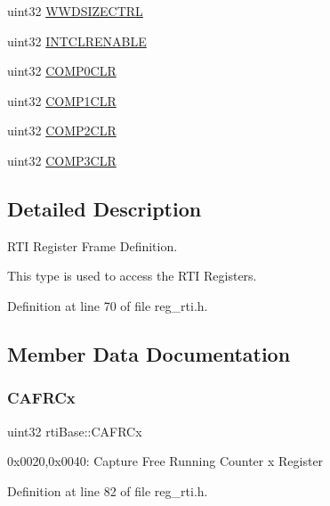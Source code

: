 \begin{DoxyCompactItemize}
uint32 \mbox{\hyperlink{structrtiBase_ad45c33765bd1083ac61de10dfe0add55}{W\+W\+D\+S\+I\+Z\+E\+C\+T\+RL}}
\item 
uint32 \mbox{\hyperlink{structrtiBase_aca543b9158f886a6d2412679cdde56c0}{I\+N\+T\+C\+L\+R\+E\+N\+A\+B\+LE}}
\item 
uint32 \mbox{\hyperlink{structrtiBase_ad86d822d66b1288e26d6fc8449d144b6}{C\+O\+M\+P0\+C\+LR}}
\item 
uint32 \mbox{\hyperlink{structrtiBase_ae40f420750f1f43dd72b7e1619d5269e}{C\+O\+M\+P1\+C\+LR}}
\item 
uint32 \mbox{\hyperlink{structrtiBase_a35ca0260e91f7626d68cf8d5ec8414c2}{C\+O\+M\+P2\+C\+LR}}
\item 
uint32 \mbox{\hyperlink{structrtiBase_acd6654f6188cb394c333a0e8498f346b}{C\+O\+M\+P3\+C\+LR}}
\end{DoxyCompactItemize}


\subsection{Detailed Description}
R\+TI Register Frame Definition. 

This type is used to access the R\+TI Registers. 

Definition at line 70 of file reg\+\_\+rti.\+h.



\subsection{Member Data Documentation}
\mbox{\label{structrtiBase_a36350363007fe2fd3acce45cab3badb4}} 
\subsubsection{\texorpdfstring{C\+A\+F\+R\+Cx}{CAFRCx}}
{\footnotesize\ttfamily uint32 rti\+Base\+::\+C\+A\+F\+R\+Cx}

0x0020,0x0040\+: Capture Free Running Counter x Register 

Definition at line 82 of file reg\+\_\+rti.\+h.

\mbox{\label{structrtiBase_ae185e690f20a1de8b10f56d9cdbb1eaf}} 
